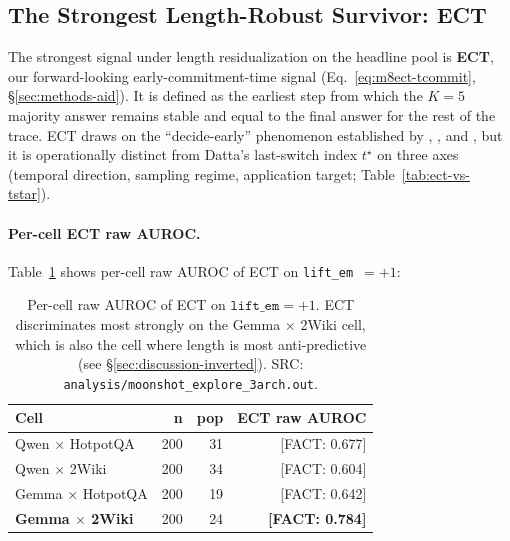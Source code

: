 \documentclass[11pt]{article}
\newcommand{\FACT}[1]{{\color{blue}\textsf{[FACT: #1]}}}
\begin{document}
\subsection{The Strongest Length-Robust Survivor: ECT}
\label{sec:results-m8ect}

The strongest signal under length residualization on the headline pool is
\textbf{ECT}, our forward-looking early-commitment-time signal
(Eq.~\ref{eq:m8ect-tcommit}, \S\ref{sec:methods-aid}). It is defined as the
earliest step from which the $K{=}5$ majority answer remains stable and equal
to the final answer for the rest of the trace. ECT draws on the
``decide-early'' phenomenon established by
\citet{Datta_DecideEarlyExplainLater},
\citet{Wang_ChainOfProbeCoTStepByStep}, and
\citet{Chen_DynamicInstabilityLLMReasoning}, but it is operationally distinct
from Datta's last-switch index $t^\star$ on three axes (temporal direction,
sampling regime, application target; Table~\ref{tab:ect-vs-tstar}).

\paragraph{Per-cell ECT raw AUROC.} Table~\ref{tab:m8-percell} shows per-cell
raw AUROC of ECT on \texttt{lift\_em}~$=+1$:

\begin{table}[h]
\centering\small
\begin{tabular}{@{}lrrr@{}}
\toprule
\textbf{Cell} & \textbf{n} & \textbf{pop} & \textbf{ECT raw AUROC} \\
\midrule
Qwen $\times$ HotpotQA & 200 & 31 & \FACT{0.677} \\
Qwen $\times$ 2Wiki    & 200 & 34 & \FACT{0.604} \\
Gemma $\times$ HotpotQA & 200 & 19 & \FACT{0.642} \\
\textbf{Gemma $\times$ 2Wiki} & 200 & 24 & \textbf{\FACT{0.784}} \\
\bottomrule
\end{tabular}
\caption{Per-cell raw AUROC of ECT on $\texttt{lift\_em}{=}+1$.
ECT discriminates most strongly on the Gemma $\times$ 2Wiki cell, which
is also the cell where length is most anti-predictive (see
\S\ref{sec:discussion-inverted}). SRC:
\texttt{analysis/moonshot\_explore\_3arch.out}.}
\label{tab:m8-percell}
\end{table}
\end{document}
